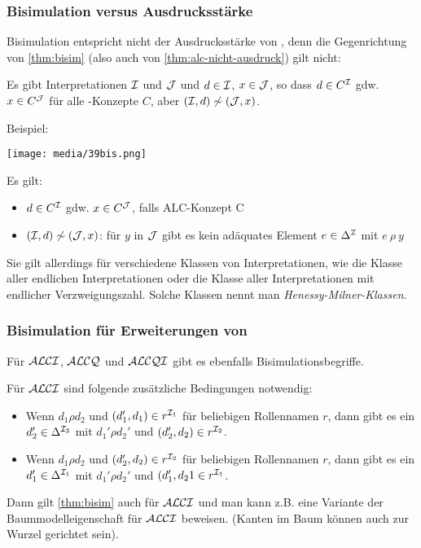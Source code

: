 \subsubsection{Bisimulation versus Ausdrucksstärke}\label{bisimulation-versus-ausdrucksstuxe4rke}

Bisimulation entspricht nicht der Ausdrucksstärke von \ALC, denn die Gegenrichtung von \autoref{thm:bisim} (also auch von \autoref{thm:alc-nicht-ausdruck}) gilt nicht:

Es gibt Interpretationen $\mathcal{I}$ und $\mathcal{J}$ und $d \in \mathcal{I}$, $x \in \mathcal{J}$, so dass $d \in C^{\mathcal{I}}$ gdw. $x \in C^{\mathcal{J}}$ für alle \ALC-Konzepte $C$, aber $(\mathcal{I},d) \not\sim (\mathcal{J},x)$. 

\begin{tafel}
Beispiel:

\texttt{[image: media/39bis.png]}

Es gilt:

\begin{itemize}
  \item $d \in C^{\mathcal{I}}$ gdw. $x \in C^{\mathcal{J}}$, falls ALC-Konzept C
  \item $(\mathcal{I},d) \not\sim (\mathcal{J},x)$: für $y$ in $\mathcal{J}$ gibt es kein adäquates Element $e \in \Delta^{\mathcal{I}}$ mit $e\ \rho\ y$
\end{itemize}
\end{tafel}

Sie gilt allerdings für verschiedene Klassen von Interpretationen, wie die Klasse aller endlichen Interpretationen oder die Klasse aller Interpretationen mit endlicher Verzweigungszahl. Solche Klassen nennt man \emph{Henessy-Milner-Klassen}.

\subsubsection{Bisimulation für Erweiterungen von \texorpdfstring{\ALC}{ALC}}\label{bisimulation-in-alc}

Für $\mathcal{A}\mathcal{L}\mathcal{C}\mathcal{I}$, $\mathcal{A}\mathcal{L}\mathcal{C}\mathcal{Q}$ und $\mathcal{A}\mathcal{L}\mathcal{C}\mathcal{Q}\mathcal{I}$ gibt es ebenfalls Bisimulationsbegriffe.

Für $\mathcal{A}\mathcal{L}\mathcal{C}\mathcal{I}$ sind folgende zusätzliche Bedingungen notwendig:
\begin{itemize}
    \item Wenn $d_1 \rho d_2$ und $(d_1', d_1) \in r^{\mathcal{I}_1}$ für beliebigen Rollennamen $r$, dann gibt es ein $d_2' \in \Delta^{\mathcal{I}_2}$ mit $d_1' \rho d_2'$ und $(d_2', d_2) \in r^{\mathcal{I}_2}$.
    \item Wenn $d_1 \rho d_2$ und $(d_2', d_2) \in r^{\mathcal{I}_2}$ für beliebigen Rollennamen $r$, dann gibt es ein $d_1' \in \Delta^{\mathcal{I}_1}$ mit $d_1' \rho d_2'$ und $(d_1', d_21 \in r^{\mathcal{I}_1}$.
\end{itemize}
Dann gilt \autoref{thm:bisim} auch für $\mathcal{A}\mathcal{L}\mathcal{C}\mathcal{I}$ und man kann z.B. eine Variante der Baummodelleigenschaft für $\mathcal{A}\mathcal{L}\mathcal{C}\mathcal{I}$ beweisen. (Kanten im Baum können auch zur Wurzel gerichtet sein).

